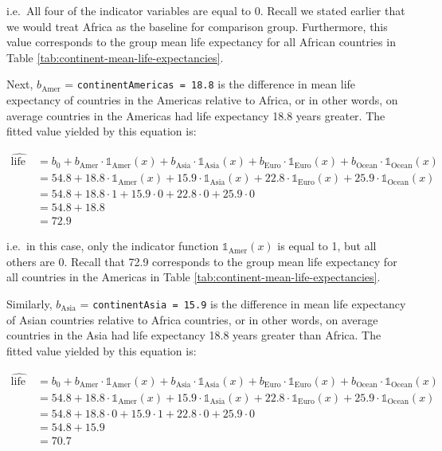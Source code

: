 \documentclass[12pt, krantz2,]{krantz}
\begin{document}
i.e.~All four of the indicator variables are equal to 0. Recall we stated earlier that we would treat Africa as the baseline for comparison group. Furthermore, this value corresponds to the group mean life expectancy for all African countries in Table \ref{tab:continent-mean-life-expectancies}.

Next, \(b_{\text{Amer}}\) = \texttt{continentAmericas\ =\ 18.8} is the difference in mean life expectancy of countries in the Americas relative to Africa, or in other words, on average countries in the Americas had life expectancy 18.8 years greater. The fitted value yielded by this equation is:

\begin{align}
\widehat{\text{life exp}} &= b_0 + b_{\text{Amer}}\cdot\mathbb{1}_{\mbox{Amer}}(x) + b_{\text{Asia}}\cdot\mathbb{1}_{\mbox{Asia}}(x)
+ b_{\text{Euro}}\cdot\mathbb{1}_{\mbox{Euro}}(x) + b_{\text{Ocean}}\cdot\mathbb{1}_{\mbox{Ocean}}(x)\\
&= 54.8 + 18.8\cdot\mathbb{1}_{\mbox{Amer}}(x) + 15.9\cdot\mathbb{1}_{\mbox{Asia}}(x)
+ 22.8\cdot\mathbb{1}_{\mbox{Euro}}(x) + 25.9\cdot\mathbb{1}_{\mbox{Ocean}}(x)\\
&= 54.8 + 18.8\cdot 1 + 15.9\cdot 0 + 22.8\cdot 0 + 25.9\cdot 0\\
&= 54.8 + 18.8\\
&= 72.9
\end{align}

i.e.~in this case, only the indicator function \(\mathbb{1}_{\mbox{Amer}}(x)\) is equal to 1, but all others are 0. Recall that 72.9 corresponds to the group mean life expectancy for all countries in the Americas in Table \ref{tab:continent-mean-life-expectancies}.

Similarly, \(b_{\text{Asia}}\) = \texttt{continentAsia\ =\ 15.9} is the difference in mean life expectancy of Asian countries relative to Africa countries, or in other words, on average countries in the Asia had life expectancy 18.8 years greater than Africa. The fitted value yielded by this equation is:

\begin{align}
\widehat{\text{life exp}} &= b_0 + b_{\text{Amer}}\cdot\mathbb{1}_{\mbox{Amer}}(x) + b_{\text{Asia}}\cdot\mathbb{1}_{\mbox{Asia}}(x)
+ b_{\text{Euro}}\cdot\mathbb{1}_{\mbox{Euro}}(x) + b_{\text{Ocean}}\cdot\mathbb{1}_{\mbox{Ocean}}(x)\\
&= 54.8 + 18.8\cdot\mathbb{1}_{\mbox{Amer}}(x) + 15.9\cdot\mathbb{1}_{\mbox{Asia}}(x)
+ 22.8\cdot\mathbb{1}_{\mbox{Euro}}(x) + 25.9\cdot\mathbb{1}_{\mbox{Ocean}}(x)\\
&= 54.8 + 18.8\cdot 0 + 15.9\cdot 1 + 22.8\cdot 0 + 25.9\cdot 0\\
&= 54.8 + 15.9\\
&= 70.7
\end{align}
\end{document}
